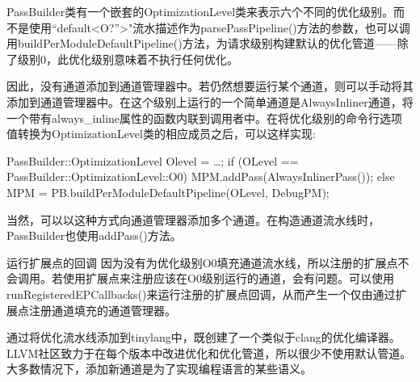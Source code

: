 \begin{enumerate}
PassBuilder类有一个嵌套的OptimizationLevel类来表示六个不同的优化级别。而不是使用“default<O?”>"流水描述作为parsePassPipeline()方法的参数，也可以调用buildPerModuleDefaultPipeline()方法，为请求级别构建默认的优化管道——除了级别0，此优化级别意味着不执行任何优化。

因此，没有通道添加到通道管理器中。若仍然想要运行某个通道，则可以手动将其添加到通道管理器中。在这个级别上运行的一个简单通道是AlwaysInliner通道，将一个带有always\_inline属性的函数内联到调用者中。在将优化级别的命令行选项值转换为OptimizationLevel类的相应成员之后，可以这样实现:

\begin{cpp}
PassBuilder::OptimizationLevel Olevel = …;
if (OLevel == PassBuilder::OptimizationLevel::O0)
    MPM.addPass(AlwaysInlinerPass());
else
    MPM = PB.buildPerModuleDefaultPipeline(OLevel, DebugPM);
\end{cpp}

当然，可以以这种方式向通道管理器添加多个通道。在构造通道流水线时，PassBuilder也使用addPass()方法。

\end{enumerate}

\begin{myTip}{运行扩展点的回调}
因为没有为优化级别O0填充通道流水线，所以注册的扩展点不会调用。若使用扩展点来注册应该在O0级别运行的通道，会有问题。可以使用runRegisteredEPCallbacks()来运行注册的扩展点回调，从而产生一个仅由通过扩展点注册通道填充的通道管理器。
\end{myTip}

通过将优化流水线添加到tinylang中，既创建了一个类似于clang的优化编译器。LLVM社区致力于在每个版本中改进优化和优化管道，所以很少不使用默认管道。大多数情况下，添加新通道是为了实现编程语言的某些语义。





































